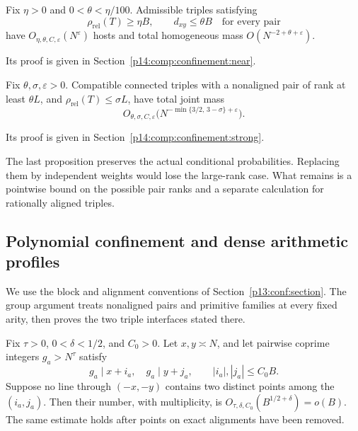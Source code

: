 \begin{proposition}
\label{p13:conf:near-primitive}
Fix \(\eta>0\) and \(0<\theta<\eta/100\).
Admissible triples satisfying
\[
 \rho_{\mathrm{rel}}(T)\ge\eta B,\qquad
 d_{xy}\le\theta B\quad\text{for every pair}
\]
have \(O_{\eta,\theta,C,\varepsilon}(N^\varepsilon)\)
hosts and total homogeneous mass
\(O(N^{-2+\theta+\varepsilon})\).
\end{proposition}

Its proof is given in Section~\ref{p14:comp:confinement:near}.

\begin{proposition}
\label{p13:conf:strong-profile}
Fix \(\theta,\sigma,\varepsilon>0\).
Compatible connected triples with a nonaligned pair
of rank at least \(\theta L\), and
\(\rho_{\mathrm{rel}}(T)\le\sigma L\), have total
joint mass
\[
 O_{\theta,\sigma,C,\varepsilon}
       \bigl(N^{-\min\{3/2,\,3-\sigma\}+\varepsilon}\bigr).
\]
\end{proposition}

Its proof is given in Section~\ref{p14:comp:confinement:strong}.



The last proposition preserves the actual conditional
probabilities. Replacing them by independent weights
would lose the large-rank case. What remains is a
pointwise bound on the possible pair ranks and a separate
calculation for rationally aligned triples.

\subsection{Polynomial confinement and dense arithmetic profiles}
\label{p14:comp:confinement}

We use the block and alignment conventions of
Section~\ref{p13:conf:section}. The group argument treats nonaligned
pairs and primitive families at every fixed arity, then proves the
two triple interfaces stated there.

\begin{lemma}
\label{p13:conf:groups}
Fix \(\tau>0\), \(0<\delta<1/2\), and \(C_0>0\).
Let \(x,y\asymp N\), and let pairwise coprime integers
\(g_a>N^\tau\) satisfy
\[
 g_a\mid x+i_a,\quad g_a\mid y+j_a,\qquad
 |i_a|,|j_a|\le C_0B.
\]
Suppose no line through \((-x,-y)\) contains two
distinct points among the \((i_a,j_a)\).
Then their number, with multiplicity, is
\(O_{\tau,\delta,C_0}(B^{1/2+\delta})=o(B)\).
The same estimate holds after points on exact alignments
have been removed.
\end{lemma}

